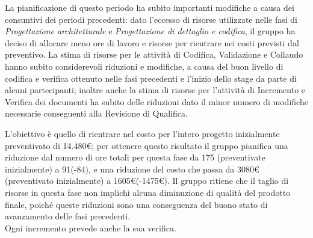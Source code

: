 La pianificazione di questo periodo ha subito importanti modifiche a causa dei consuntivi dei periodi precedenti: dato l'eccesso di risorse utilizzate nelle fasi di \textit{Progettazione architetturale} e \textit{Progettazione di dettaglio e codifica}, il gruppo ha deciso di allocare meno ore di lavoro e risorse per rientrare nei costi previsti dal preventivo.
La stima di risorse per le attività di Codifica, Validazione e Collaudo hanno subito considerevoli riduzioni e modifiche, a causa del buon livello di codifica e verifica ottenuto nelle fasi precedenti e l'inizio dello stage da parte di alcuni partecipanti; inoltre anche la stima di risorse per l'attività di Incremento e Verifica dei documenti ha subito delle riduzioni dato il minor numero di modifiche necessarie conseguenti alla Revisione di Qualifica.

L'obiettivo è quello di rientrare nel costo per l'intero progetto inizialmente preventivato di 14.480€; per ottenere questo risultato il gruppo pianifica una riduzione dal numero di ore totali per questa fase da 175 (preventivate inizialmente) a 91(-84), e una riduzione del costo che passa da 3080€ (preventivato inizialmente) a 1605€(-1475€).
Il gruppo ritiene che il taglio di risorse in questa fase non implichi alcuna diminuzione di qualità del prodotto finale, poiché queste riduzioni sono una conseguenza del buono stato di avanzamento delle fasi precedenti.  \\

Ogni incremento prevede anche la sua verifica. \\

